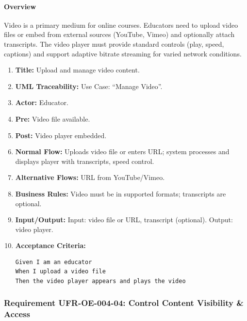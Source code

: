 \paragraph{Overview}
Video is a primary medium for online courses. Educators need to upload video files or embed from external sources (YouTube, Vimeo) and optionally attach transcripts. The video player must provide standard controls (play, speed, captions) and support adaptive bitrate streaming for varied network conditions.
\begin{enumerate}[label=\textbf{\arabic*.}]
\item \textbf{Title:} Upload and manage video content.
\item \textbf{UML Traceability:} Use Case: “Manage Video”.
\item \textbf{Actor:} Educator.
\item \textbf{Pre:} Video file available.
\item \textbf{Post:} Video player embedded.
\item \textbf{Normal Flow:} Uploads video file or enters URL; system processes and displays player with transcripts, speed control.
\item \textbf{Alternative Flows:} URL from YouTube/Vimeo.
\item \textbf{Business Rules:} Video must be in supported formats; transcripts are optional.
\item \textbf{Input/Output:} Input: video file or URL, transcript (optional). Output: video player.
\item \textbf{Acceptance Criteria:}
    \begin{verbatim}
Given I am an educator
When I upload a video file
Then the video player appears and plays the video
    \end{verbatim}
\end{enumerate}

\subsubsection{Requirement UFR-OE-004-04: Control Content Visibility \& Access}
